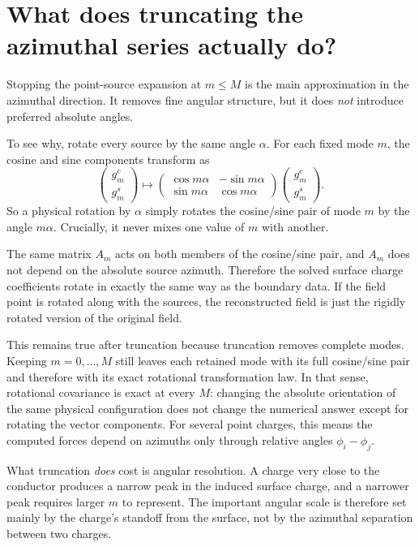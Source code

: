 \documentclass[11pt]{article}
\begin{document}
\section{What does truncating the azimuthal series actually do?}

Stopping the point-source expansion at $m\le M$ is the main approximation in
the azimuthal direction.  It removes fine angular structure, but it does
\emph{not} introduce preferred absolute angles.

To see why, rotate every source by the same angle $\alpha$.  For each fixed
mode $m$, the cosine and sine components transform as
\begin{equation}
  \begin{pmatrix} g^c_m \\ g^s_m \end{pmatrix}
  \longmapsto
  \begin{pmatrix} \cos m\alpha & -\sin m\alpha \\
                  \sin m\alpha & \cos m\alpha \end{pmatrix}
  \begin{pmatrix} g^c_m \\ g^s_m \end{pmatrix}.
  \label{eq:mode-rotation}
\end{equation}
So a physical rotation by $\alpha$ simply rotates the cosine/sine pair of mode
$m$ by the angle $m\alpha$.  Crucially, it never mixes one value of $m$ with
another.

The same matrix $A_m$ acts on both members of the cosine/sine pair, and $A_m$
does not depend on the absolute source azimuth.  Therefore the solved surface
charge coefficients rotate in exactly the same way as the boundary data.  If
the field point is rotated along with the sources, the reconstructed field is
just the rigidly rotated version of the original field.

This remains true after truncation because truncation removes complete modes.
Keeping $m=0,\ldots,M$ still leaves each retained mode with its full cosine/sine
pair and therefore with its exact rotational transformation law.  In that
sense, rotational covariance is exact at every $M$: changing the absolute
orientation of the same physical configuration does not change the numerical
answer except for rotating the vector components. For several point charges, this means the computed forces depend on azimuths only through relative angles $\phi_i-\phi_j$.

What truncation \emph{does} cost is angular resolution.  A charge very close to
the conductor produces a narrow peak in the induced surface charge, and a
narrower peak requires larger $m$ to represent.  The important angular scale is
therefore set mainly by the charge's standoff from the surface, not by the
azimuthal separation between two charges.
\end{document}
